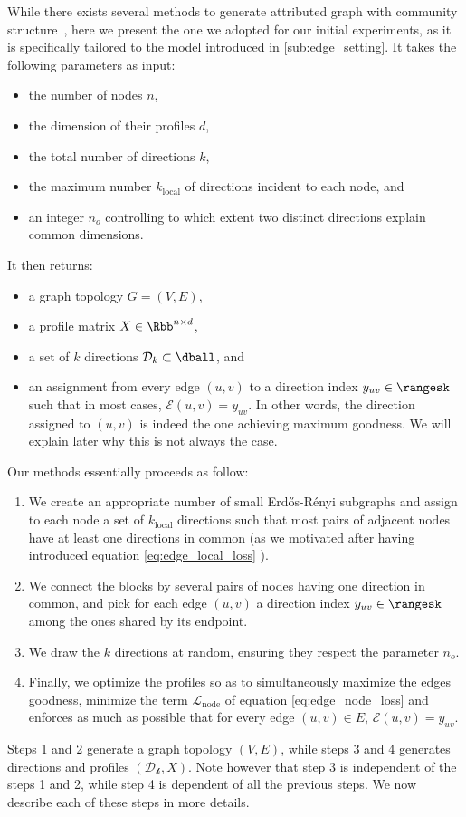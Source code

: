 While there exists several methods to generate attributed graph with community
structure~\autocites{Yang2013}{XuBayesian14}{Kataoka2016}, here we present the one we adopted for
our initial experiments, as it is specifically tailored to the model introduced in \autoref{sub:edge_setting}.
It takes the following parameters as input:
\begin{itemize}[nosep]
  \item the number of nodes $n$,
  \item the dimension of their profiles $d$,
  \item the total number of directions $k$,
  \item the maximum number $k_\mathrm{local}$ of directions incident to each node, and
  \item an integer $n_o$ controlling to which extent two distinct directions explain common dimensions.
\end{itemize}
It then returns:
\begin{itemize}[nosep]
  \item a graph topology $G=(V,E)$,
  \item a profile matrix $X\in \Rbb^{n\times d}$,
  \item a set of $k$ directions $\mathcal{D}_k \subset \dball$, and
  \item an assignment from every edge $(u,v)$ to a direction index $y_{uv} \in \rangesk$ such that in
    most cases, $\mathcal{E}(u,v) = y_{uv}$. In other words, the direction assigned to $(u,v)$ is
    indeed the one achieving maximum goodness. We will explain later why this is not always the
    case.
\end{itemize}
Our methods essentially proceeds as follow:
\begin{enumerate}[1),nosep]
  \item We create an appropriate number of small Erdős-Rényi subgraphs and assign to each node a set of
    $k_\mathrm{local}$ directions such that most pairs of adjacent nodes have at least one
    directions in common (as we motivated after having introduced equation \eqref{eq:edge_local_loss}
    ).
  \item We connect the blocks by several pairs of nodes having one direction in common, and pick for
    each edge $(u,v)$ a direction index $y_{uv} \in \rangesk$ among the ones shared by its endpoint.
  \item We draw the $k$ directions at random, ensuring they respect the parameter $n_o$.
  \item Finally, we optimize the profiles so as to simultaneously maximize the edges goodness,
    minimize the term $\mathcal{L}_{\mathrm{node}}$ of equation \eqref{eq:edge_node_loss} and
    enforces as much as possible that for every edge $(u,v) \in E$, $\mathcal{E}(u,v) = y_{uv}$.
\end{enumerate}
Steps 1 and 2 generate a graph topology $(V, E)$, while steps 3 and 4 generates directions and
profiles $(\mathcal{D_k}, X)$. Note however that step 3 is independent of the steps 1 and 2, while
step 4 is dependent of all the previous steps.
We now describe each of these steps in more details.

